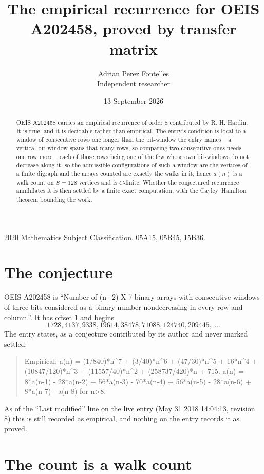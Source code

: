 \documentclass[11pt,a4paper]{article}
\title{The empirical recurrence for OEIS A202458, proved by transfer matrix}
\author{Adrian Perez Fontelles\\ \small Independent researcher}
\date{13 September 2026}
\theoremstyle{plain}
\theoremstyle{definition}
\begin{document}
\maketitle

\begin{abstract}
OEIS A202458 carries an empirical recurrence of order $8$ contributed by R. H. Hardin. It is
true, and it is decidable rather than empirical. The entry's condition is local to a window of consecutive rows one longer than the bit-window the entry names -- a vertical bit-window spans that many rows, so comparing two consecutive ones needs one row more -- each of those rows being one of the few whose own bit-windows do not decrease along it, so
the admissible configurations of such a window are the vertices of a finite digraph and the
arrays counted are exactly the walks in it; hence $a(n)$ is a walk count on $S=128$ vertices
and is $C$-finite. Whether the conjectured recurrence annihilates it is then settled by a
finite exact computation, with the Cayley--Hamilton theorem bounding the work.
\end{abstract}

\noindent\small 2020 Mathematics Subject Classification. 05A15, 05B45, 15B36.\normalsize

\section{The conjecture}

OEIS A202458 is ``Number of (n+2) X 7 binary arrays with consecutive windows of three bits considered as a binary number nondecreasing in every row and column.''. It has offset $1$ and begins
\[
1728, 4137, 9338, 19614, 38478, 71088, 124740, 209445,\ \dots
\]
The entry states, as a conjecture contributed by its author and never marked settled:
\begin{quote}
Empirical: a(n) = (1/840)*n\^{}7 + (3/40)*n\^{}6 + (47/30)*n\^{}5 + 16*n\^{}4 + (10847/120)*n\^{}3 + (11557/40)*n\^{}2 + (258737/420)*n + 715. a(n) = 8*a(n-1) - 28*a(n-2) + 56*a(n-3) - 70*a(n-4) + 56*a(n-5) - 28*a(n-6) + 8*a(n-7) - a(n-8) for n>8.
\end{quote}
As of the ``Last modified'' line on the live entry (May 31 2018 14:04:13, revision 8) this is still
recorded as empirical, and nothing on the entry records it as proved.

\section{The count is a walk count}
\end{document}
